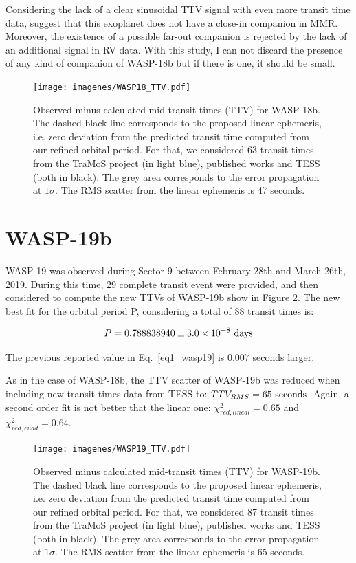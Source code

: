 Considering the lack of a clear sinusoidal TTV signal with even more transit time data, suggest that this exoplanet does not have a close-in companion in MMR. Moreover, the existence of a possible far-out companion is rejected by the lack of an additional signal in RV data. With this study, I can not discard the presence of any kind of companion of WASP-18b but if there is one, it should be small. 


\begin{figure}[h]
\texttt{[image: imagenes/WASP18\_TTV.pdf]}
\caption{Observed minus calculated mid-transit times (TTV) for WASP-18b. The dashed black line corresponds to the proposed linear ephemeris, i.e. zero deviation from the predicted transit time  computed from our refined orbital period. For that, we considered 63 transit times from the TraMoS project (in light blue), published works and TESS (both in black). The grey area corresponds to the error propagation at $1\sigma$. The RMS scatter from the linear ephemeris is 47 seconds.}
\label{wasp18_ttv}
\end{figure}

\section{WASP-19b}

WASP-19 was observed during Sector 9 between February 28th and March 26th, 2019. During this time, 29 complete transit event were provided, and then considered to compute the new TTVs of WASP-19b show in Figure \ref{wasp19_ttv}. The new best fit for the orbital period P, considering a total of 88 transit times is:

\begin{equation}
P = 0.788838940 \pm 3.0\times10^{-8} ~\rm days
\end{equation}

The previous reported value in Eq.~\ref{eq1_wasp19} is $0.007$ seconds larger.

As in the case of WASP-18b, the TTV scatter of WASP-19b was reduced when including new transit times data from TESS to: $TTV_{RMS}=65~\rm seconds$. Again, a second order fit is not better that the linear one: $\chi^{2}_{red,lineal}= 0.65$ and $\chi^{2}_{red,cuad}= 0.64$. 

\begin{figure}[ht]
\texttt{[image: imagenes/WASP19\_TTV.pdf]}
\caption{Observed minus calculated mid-transit times (TTV) for WASP-19b. The dashed black line corresponds to the proposed linear ephemeris, i.e. zero deviation from the predicted transit time  computed from our refined orbital period. For that, we considered 87 transit times from the TraMoS project (in light blue), published works and TESS (both in black). The grey area corresponds to the error propagation at $1\sigma$. The RMS scatter from the linear ephemeris is 65 seconds.}
\label{wasp19_ttv}
\end{figure}

